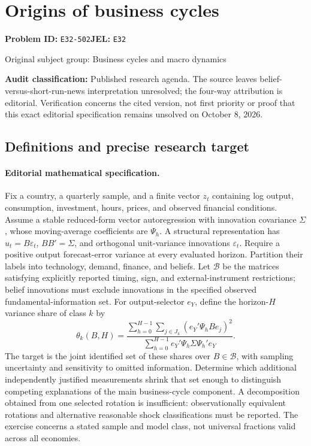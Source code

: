 \documentclass[11pt,a4paper]{article}
\begin{document}
\section*{Origins of business cycles}
\textbf{Problem ID:} \texttt{E32-502}\quad \textbf{JEL:} \texttt{E32}\par
\label{problem:OP-0231}
{\sffamily\small\color{muted}Original subject group: Business cycles and macro dynamics\par}
\label{definitions:problem:30007512}
\textbf{Audit classification:} Published research agenda. The source leaves belief-versus-short-run-news interpretation unresolved; the four-way attribution is editorial. Verification concerns the cited version, not first priority or proof that this exact editorial specification remains unsolved on October 8, 2026.
\subsection*{Definitions and precise research target}
\paragraph{Editorial mathematical specification.} Fix a country, a quarterly sample, and a finite vector \(z_t\) containing log output, consumption, investment, hours, prices, and observed financial conditions. Assume a stable reduced-form vector autoregression with innovation covariance \(\Sigma\), whose moving-average coefficients are \(\Psi_h\). A structural representation has \(u_t=B\varepsilon_t\), \(BB'=\Sigma\), and orthogonal unit-variance innovations \(\varepsilon_t\). Require a positive output forecast-error variance at every evaluated horizon. Partition their labels into technology, demand, finance, and beliefs. Let \(\mathcal B\) be the matrices satisfying explicitly reported timing, sign, and external-instrument restrictions; belief innovations must exclude innovations in the specified observed fundamental-information set.
For output-selector \(e_Y\), define the horizon-\(H\) variance share of class \(k\) by
\[
\theta_k(B,H)=\frac{\sum_{h=0}^{H-1}\sum_{j\in J_k}(e_Y'\Psi_hB e_j)^2}
{\sum_{h=0}^{H-1}e_Y'\Psi_h\Sigma\Psi_h'e_Y}.
\]
The target is the joint identified set of these shares over \(B\in\mathcal B\), with sampling uncertainty and sensitivity to omitted information. Determine which additional independently justified measurements shrink that set enough to distinguish competing explanations of the main business-cycle component. A decomposition obtained from one selected rotation is insufficient: observationally equivalent rotations and alternative reasonable shock classifications must be reported. The exercise concerns a stated sample and model class, not universal fractions valid across all economies.
\end{document}
